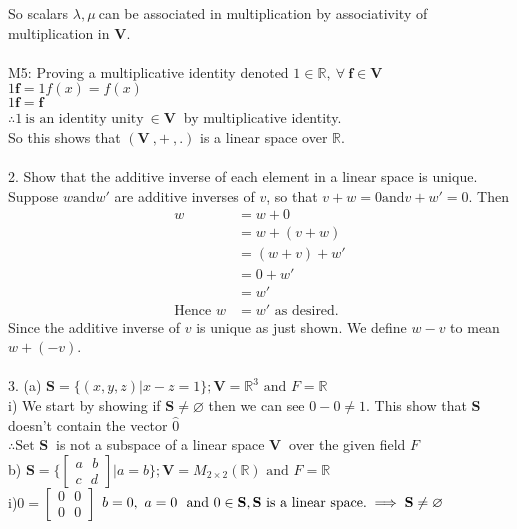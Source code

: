 \documentclass[10pt,a4paper]{article}
\numberwithin{equation}{section}
\begin{document}
So scalars $\lambda,\mu~$can be associated in multiplication by associativity of multiplication in $\mathbf{V}$. \\
~\\
M5: Proving a multiplicative identity denoted $1 \in\mathbb{R},~\forall~\mathbf{f} \in\mathbf{V}$ \\
$1\mathbf{f}=1f(x)=f(x)$ \\
$1\mathbf{f}=\mathbf{f}$ \\
$\therefore 1~ \text{is an identity unity}~ \in\mathbf{V} ~$ by multiplicative identity.\\
So this shows that $(\textbf{V}~,+~,.)$ is a linear space over $\mathbb{R}$. \\
~\\
2. Show that the additive inverse of each element in a linear space is unique. \\
Suppose $w \text{and} w'$ are additive inverses of $v$, so that $v + w = 0 \text{and} v + w'= 0$. Then 
\begin{align*}
	w &= w + 0 \\
	  &= w + (v + w) \\
	  &= (w + v) + w' \\ 
	  &= 0 + w'\\
	  &= w' \\
	  \text{Hence } w &= w' \text{ as desired.}
\end{align*}
Since the additive inverse of $v$ is unique as just shown. We define $w-v$ to mean $w + (-v)$. \\
~\\
3. (a) $\mathbf{S}=\{(x,y,z)|x-z=1\}; \mathbf{V} = \mathbb{R}^3 \text{ and } F =\mathbb{R}$ \\
i) We start by showing if $\mathbf{S} \neq \varnothing$ then we can see $0-0 \neq 1$. This show that $\mathbf{S}~$ doesn't contain the vector $\hat{0}$ \\
$\therefore \text{Set } \mathbf{S}~$ is not a subspace of a linear space $\mathbf{V}~$ over the given field $F$ \\
b) $\mathbf{S}=\Big\{\begin{bmatrix}
	a ~~~ b \\
	c ~~~ d
\end{bmatrix}|a=b\Big\}; \mathbf{V}=M_{2\times2}(\mathbb{R}) \text{ and } F= \mathbb{R}$ \\
i)$0=\begin{bmatrix}
		0 ~~~ 0 \\
		0 ~~~ 0
	\end{bmatrix}$
$b=0,~ a=0~\text{ and } 0 \in \mathbf{S}, \mathbf{S} \text{ is a linear space.} \\ \implies \mathbf{S} \neq \varnothing$ \\
\end{document}
